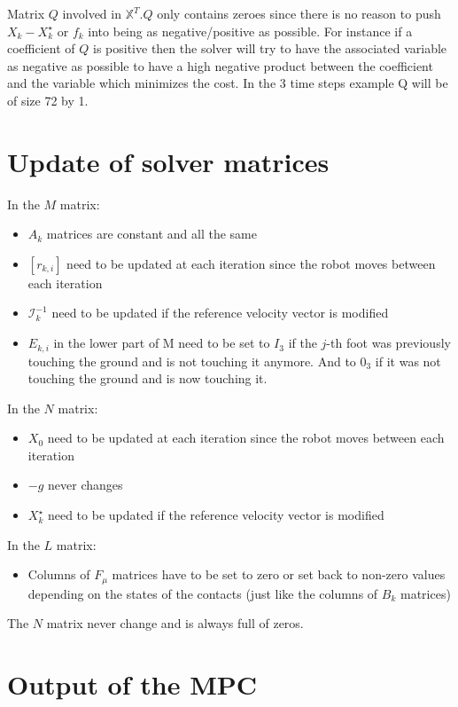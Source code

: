 \documentclass[a4paper,11pt]{article}
\begin{document}
Matrix $Q$ involved in $\mathbb{X}^T.Q$ only contains zeroes since there is no reason to push $X_k - X_k^\star$ or $f_k$ into being as negative/positive as possible. For instance if a coefficient of $Q$ is positive then the solver will try to have the associated variable as negative as possible to have a high negative product between the coefficient and the variable which minimizes the cost. In the 3 time steps example Q will be of size 72 by 1.

\section*{Update of solver matrices}

In the $M$ matrix:
\begin{itemize}
\item $A_k$ matrices are constant and all the same
\item $[r_{k,i}]$ need to be updated at each iteration since the robot moves between each iteration
\item $\mathcal{I}_k^{-1}$ need to be updated if the reference velocity vector is modified
\item $E_{k,i}$ in the lower part of M need to be set to $I_3$ if the $j$-th foot was previously touching the ground and is not touching it anymore. And to $0_3$ if it was not touching the ground and is now touching it.
\end{itemize}

In the $N$ matrix:
\begin{itemize}
	\item $X_0$ need to be updated at each iteration since the robot moves between each iteration
	\item $- g$ never changes
	\item $X_k^\star$ need to be updated if the reference velocity vector is modified
\end{itemize}

In the $L$ matrix:
\begin{itemize}
	\item Columns of $F_\mu$ matrices have to be set to zero or set back to non-zero values depending on the states of the contacts (just like the columns of $B_k$ matrices)
\end{itemize}

The $N$ matrix never change and is always full of zeros.

\section*{Output of the MPC}
\end{document}
